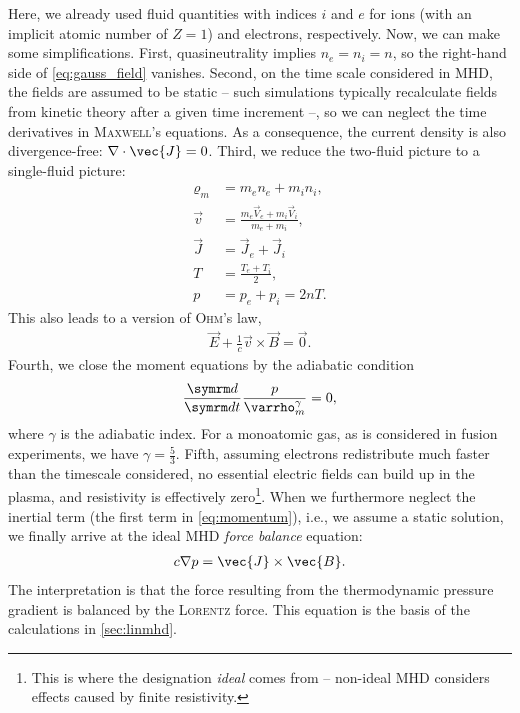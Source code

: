 Here, we already used fluid quantities with indices $i$ and $e$ for ions (with an implicit atomic number of $Z = 1$) and electrons, respectively. Now, we can make some simplifications. First, quasineutrality implies $n_{e} = n_{i} = n$, so the right-hand side of \cref{eq:gauss_field} vanishes. Second, on the time scale considered in MHD, the fields are assumed to be static -- such simulations typically recalculate fields from kinetic theory after a given time increment --, so we can neglect the time derivatives in \textsc{Maxwell}'s equations. As a consequence, the current density is also divergence-free: $\divg \vec{J} = 0$. Third, we reduce the two-fluid picture to a single-fluid picture:
\begin{align}
  \varrho_{m} &= m_{e} n_{e} + m_{i} n_{i}, \\
  \vec{v} &= \frac{m_{e} \vec{V}_{e} + m_{i} \vec{V}_{i}}{m_{e} + m_{i}}, \\
  \vec{J} &= \vec{J}_{e} + \vec{J}_{i} \\
  T &= \frac{T_{e} + T_{i}}{2}, \\
  p &= p_{e} + p_{i} = 2 n T.
\end{align}
This also leads to a version of \textsc{Ohm}'s law,
\begin{gather}
  \vec{E} + \frac{1}{c} \vec{v} \times \vec{B} = \vec{0}.
\end{gather}
Fourth, we close the moment equations by the adiabatic condition
\begin{gather}
  \frac{\diff}{\diff t} \frac{p}{\varrho_{m}^{\gamma}} = 0,
\end{gather}
where $\gamma$ is the adiabatic index. For a monoatomic gas, as is considered in fusion experiments, we have $\gamma = \frac{5}{3}$. Fifth, assuming electrons redistribute much faster than the timescale considered, no essential electric fields can build up in the plasma, and resistivity is effectively zero\footnote{This is where the designation \emph{ideal} comes from -- non-ideal MHD considers effects caused by finite resistivity.}. When we furthermore neglect the inertial term (the first term in \cref{eq:momentum}), i.e., we assume a static solution, we finally arrive at the ideal MHD \emph{force balance} equation:
\begin{gather}
  c \grad p = \vec{J} \times \vec{B}. \label{eq:ideal-mhd}
\end{gather}
The interpretation is that the force resulting from the thermodynamic pressure gradient is balanced by the \textsc{Lorentz} force. This equation is the basis of the calculations in \cref{sec:linmhd}.

